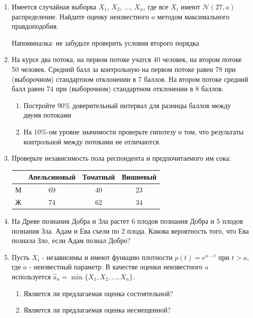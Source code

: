 \documentclass[12pt, a4paper]{article}\usepackage[]{graphicx}\usepackage[]{color}
\begin{document}
\begin{enumerate}
\item Имеется случайная выборка $X_{1}$, $X_{2}$, ..., $X_{n}$, где все $X_{i}$ имеют $\mathcal{N}(27,a)$ распределение.
Найдите оценку неизвестного $a$ методом максимального правдоподобия.

Напоминалка: не забудьте проверить условия второго порядка

\item На курсе два потока, на первом потоке учатся 40 человек, на втором
потоке 50 человек. Средний балл за контрольную на первом потоке
равен 78 при (выборочном) стандартном отклонении в 7 баллов. На
втором потоке средний балл равен 74 при (выборочном) стандартном
отклонении в 8 баллов.
\begin{enumerate}
\item Постройте 90\% доверительный интервал для разницы баллов между
двумя потоками
\item На 10\%-ом уровне значимости проверьте гипотезу о том, что
результаты контрольной между потоками не отличаются.
\end{enumerate}


\item Проверьте независимость пола респондента и предпочитаемого
им сока:

\begin{tabular}{|c|c|c|c|}
  \hline
   & Апельсиновый & Томатный & Вишневый \\
  \hline
  М & 69 & 40 & 23 \\
  Ж & 74 & 62 & 34 \\
  \hline
\end{tabular}

\item На Древе познания Добра и Зла растет 6 плодов познания Добра и 5 плодов познания Зла. Адам и Ева съели по 2 плода. Какова вероятность того, что Ева познала Зло, если Адам познал Добро?

\item Пусть $X_{i}$ - независимы и имеют функцию плотности $p(t)=e^{a-t}$ при $t>a$, где $a$ - неизвестный параметр. В качестве оценки неизвестного $a$ используется $\hat{a}_{n}=\min\{X_{1},X_{2},...,X_{n}\}$.
\begin{enumerate}
\item Является ли предлагаемая оценка состоятельной?
\item Является ли предлагаемая оценка несмещенной?
\end{enumerate}


\end{enumerate}
\end{document}
